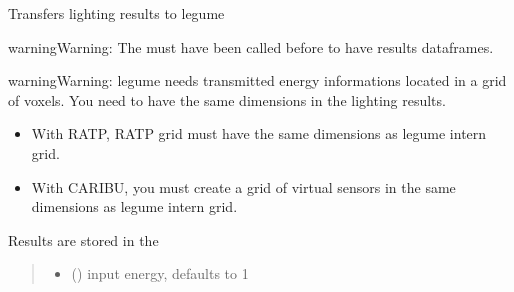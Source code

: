 \documentclass[letterpaper,10pt,english]{sphinxmanual}
\begin{document}
\begin{fulllineitems}
\begin{fulllineitems}
\label{\detokenize{reference:LVM.LightVegeManager.to_l_egume}}
\pysigstartsignatures
{}
\pysigstopsignatures
\sphinxAtStartPar
Transfers lighting results to l\sphinxhyphen{}egume

\begin{sphinxadmonition}{warning}{Warning:}
\sphinxAtStartPar
The {\hyperref[\detokenize{reference:LVM.LightVegeManager.run}]{}} must have been called before to have results dataframes.
\end{sphinxadmonition}

\begin{sphinxadmonition}{warning}{Warning:}
\sphinxAtStartPar
l\sphinxhyphen{}egume needs transmitted energy informations located in a grid of voxels. You need to have the same dimensions in the lighting results.
\begin{itemize}
\item {} 
\sphinxAtStartPar
With RATP, RATP grid must have the same dimensions as l\sphinxhyphen{}egume intern grid.

\item {} 
\sphinxAtStartPar
With CARIBU, you must create a grid of virtual sensors in the same dimensions as l\sphinxhyphen{}egume intern grid.

\end{itemize}
\end{sphinxadmonition}

\sphinxAtStartPar
Results are  stored in the 
\begin{quote}\begin{description}
\begin{itemize}
\item {} 
\sphinxAtStartPar
{} (\sphinxstyleliteralemphasis{\sphinxupquote{, }}) \textendash{} input energy, defaults to 1


\end{itemize}
\end{description}
\end{quote}
\end{fulllineitems}
\end{fulllineitems}
\end{document}
